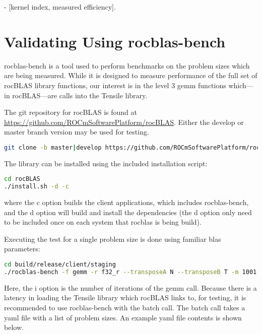\documentclass[]{article}
\begin{document}
\begin{center}
	- [kernel index, measured efficiency].
\end{center}

\section{Validating Using rocblas-bench}

rocblas-bench is a tool used to perform benchmarks on the problem sizes which are being measured. While it is designed to measure performance of the full set of rocBLAS library functions, our interest is in the level 3 gemm functions which---in rocBLAS---are calls into the Tensile library.

The git repository for rocBLAS is found at \url{https://github.com/ROCmSoftwarePlatform/rocBLAS}. Either the develop or master branch version may be used for testing.

\begin{lstlisting}[language=bash]
git clone -b master|develop https://github.com/ROCmSoftwarePlatform/rocBLAS.git
\end{lstlisting}

\noindent
The library can be installed using the included installation script:

\begin{lstlisting}[language=bash]
cd rocBLAS
./install.sh -d -c
\end{lstlisting}

\noindent
where the c option builds the client applications, which includes rocblas-bench, and the d option will build and install the dependencies (the d option only need to be included once on each system that rocblas is being build).

Executing the test for a single problem size is done using familiar blas parameters:

\begin{lstlisting}[language=bash]
cd build/release/client/staging
./rocblas-bench -f gemm -r f32_r --transposeA N --transposeB T -m 1001 -n 1536 -k 64 --alpha 1.0 --lda 1001 --ldb 1536 --beta 0.0 --ldc 1001 -i 10
\end{lstlisting}

\noindent
Here, the i option is the number of iterations of the gemm call. Because there is a latency in loading the Tensile library which rocBLAS links to, for testing, it is recommended to use rocblas-bench with the batch call. The batch call takes a yaml file with a list of problem sizes. An example yaml file contents is shown below.
\end{document}
